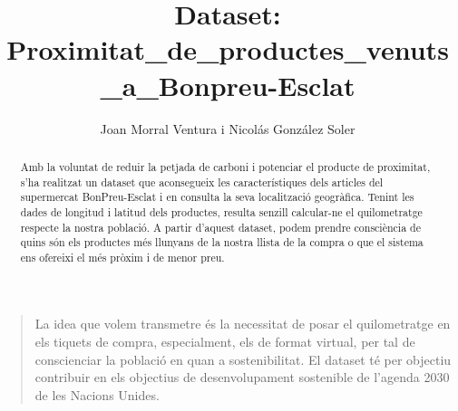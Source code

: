 \documentclass[]{scrartcl}
\title{Dataset: Proximitat\_de\_productes\_venuts\_a\_Bonpreu-Esclat}
\author{Joan Morral Ventura i Nicolás González Soler}
\begin{document}
\maketitle

\begin{abstract}
Amb la voluntat de reduir la petjada de carboni i potenciar el producte de proximitat, s'ha realitzat un dataset que aconsegueix les característiques dels articles del supermercat BonPreu-Esclat i en consulta la seva localització geogràfica. Tenint les dades de longitud i latitud dels productes, resulta senzill calcular-ne el quilometratge respecte la nostra població. A partir d'aquest dataset, podem prendre consciència de quins són els productes més llunyans de la nostra llista de la compra o que el sistema ens ofereixi el més pròxim i de menor preu. 
\end{abstract}

\begin{quote}
	La idea que volem transmetre és la necessitat de posar el quilometratge en els tiquets de compra, especialment, els de format virtual, per tal de conscienciar la població en quan a sostenibilitat. El dataset té per objectiu contribuir en els objectius de desenvolupament sostenible de l'agenda 2030 de les Nacions Unides.
\end{quote}
\end{document}
